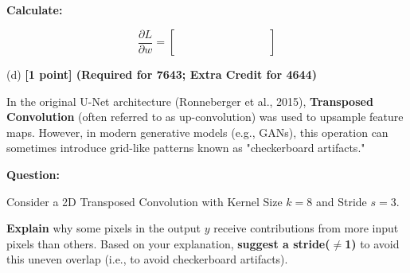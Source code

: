 \documentclass[11pt,english]{article}
\begin{document}
\begin{enumerate}[resume]
\textbf{Calculate:}

\[
\frac{\partial L}{\partial w} = 
\begin{bmatrix} 
\quad \quad & \quad \quad & \quad \quad \\ \\
\quad \quad & \quad \quad & \quad \quad \\ \\
\quad \quad & \quad \quad & \quad \quad 
\end{bmatrix}
\]

\vspace{1cm}

(d) \textbf{[1 point] (Required for 7643; Extra Credit for 4644)}

In the original U-Net architecture (Ronneberger et al., 2015), \textbf{Transposed Convolution} (often referred to as up-convolution) was used to upsample feature maps. However, in modern generative models (e.g., GANs), this operation can sometimes introduce grid-like patterns known as "checkerboard artifacts."
\vspace{0.5cm}

\textbf{Question:} 

Consider a 2D Transposed Convolution with Kernel Size $k=8$ and Stride $s=3$.

\textbf{Explain} why some pixels in the output $y$ receive contributions from more input pixels than others. Based on your explanation, \textbf{suggest a stride($\ne$1)} to avoid this uneven overlap (i.e., to avoid checkerboard artifacts).
\end{enumerate}

\newpage
\end{document}
